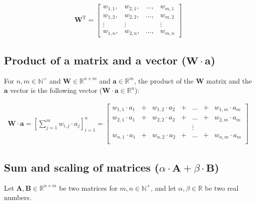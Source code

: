 \documentclass[titlepage]{article}
\begin{document}
        \begin{align*}
          \mathbf{W}^\mathrm{T}
            = \begin{bmatrix}
                w_{1,1}, & w_{2,1}, & \ldots, & w_{m,1} \\
                w_{1,2}, & w_{2,2}, & \ldots, & w_{m,2} \\
                \vdots & \vdots & & \vdots \\
                w_{1,n}, & w_{2,n}, & \ldots, & w_{m,n}
              \end{bmatrix}
        \end{align*}

      \subsection{%
        Product of a matrix and a vector ($\mathbf{W} \cdot \mathbf{a}$)
      }

        For $n, m \in \mathbb{N}^+$ and
        $\mathbf{W} \in \mathbb{R}^{n \times m}$ and
        $\mathbf{a} \in \mathbb{R}^m$, the product of the $\mathbf{W}$ matrix
        and the $\mathbf{a}$ vector is the following vector
        ($\mathbf{W} \cdot \mathbf{a} \in \mathbb{R}^n$):

        \begin{align*}
          \mathbf{W} \cdot \mathbf{a}
            = \left[ \sum_{j=1}^m w_{i,j} \cdot a_j \right]_{i=1}^n
            = \begin{bmatrix}
                w_{1,1} \cdot a_1 & + & w_{1,2} \cdot a_2
                  & + & \ldots & + & w_{1,m} \cdot a_m  \\
                w_{2,1} \cdot a_1 & + & w_{2,2} \cdot a_2
                  & + & \ldots & + & w_{2,m} \cdot a_m  \\
                & & & & \vdots & & \\
                w_{n,1} \cdot a_1 & + & w_{n,2} \cdot a_2
                  & + & \ldots & + & w_{n,m} \cdot a_m  \\
              \end{bmatrix}
        \end{align*}

      \subsection{%
        Sum and scaling of matrices
        ($\alpha \cdot \mathbf{A} + \beta \cdot \mathbf{B}$)
      }

        Let $\mathbf{A}, \mathbf{B} \in \mathbb{R}^{n \times m}$ be two matrices
        for $m, n \in \mathbb{N}^+$, and let $\alpha, \beta \in \mathbb{R}$ be
        two real numbers.
\end{document}
